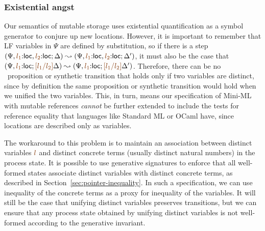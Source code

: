 \subsubsection{Existential angst} 

Our semantics of mutable storage uses existential quantification 
as a symbol generator to conjure up new locations. However, it is important
to remember that LF variables in $\Psi$ are defined by substitution,
so if there is a step 
$(\Psi, \lf{l_1}{:}{\sf loc}, \lf{l_2}{:}{\sf loc}; \Delta)
  \leadsto 
 (\Psi, \lf{l_1}{:}{\sf loc}, \lf{l_2}{:}{\sf loc}; \Delta')$,
it must also be the case that 
$(\Psi, \lf{l_1}{:}{\sf loc}; \lf{[l_1/l_2]}\Delta)
  \leadsto 
 (\Psi, \lf{l_1}{:}{\sf loc}; \lf{[l_1/l_2]}\Delta')$. 
%
Therefore, 
%
there can be no \sls~proposition or synthetic transition that 
holds only if two variables are distinct, since by definition the
same proposition or synthetic transition would hold when we unified
the two variables.
%
This, in turn, means our specification of Mini-ML with mutable
references {\it cannot} be further extended to include the tests for
reference equality that languages like Standard ML or OCaml have, since
locations are described only as variables. 

The workaround to this problem is to maintain an association between 
distinct variables $\lf{l}$ and distinct concrete terms (usually
distinct natural numbers) in the process state. It is possible
to use generative signatures to enforce that all well-formed
states associate distinct variables with distinct concrete terms, as 
described in Section~\ref{sec:pointer-inequality}. In such 
a specification, we can use inequality of the concrete terms as 
a proxy for inequality of the variables. It will still
be the case that unifying distinct variables preserves transitions,
but we can ensure that any process state obtained by unifying
distinct variables is not well-formed according to the generative
invariant.






